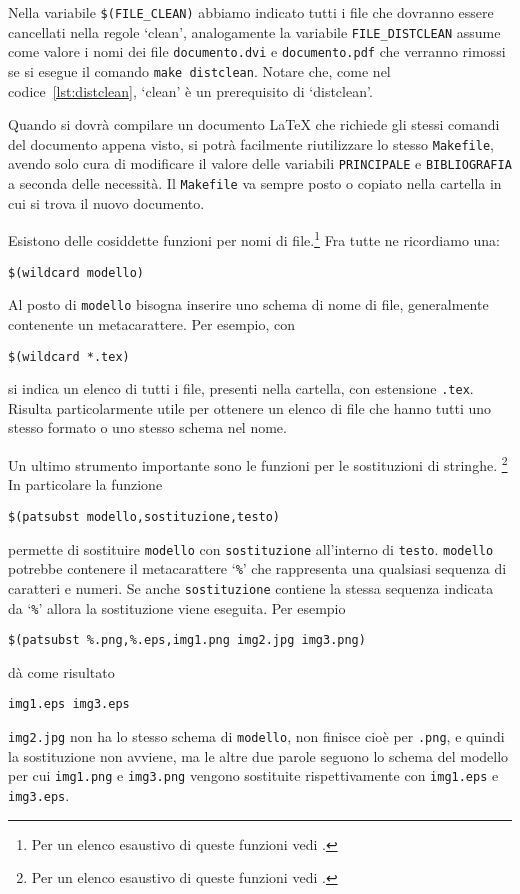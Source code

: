 Nella variabile \verb|$(FILE_CLEAN)|
abbiamo indicato tutti i file che dovranno essere cancellati nella regole
`clean', analogamente la variabile \verb|FILE_DISTCLEAN| assume come valore i
nomi dei file \verb|documento.dvi| e \verb|documento.pdf| che verranno rimossi
se si esegue il comando \verb|make distclean|.  Notare che, come nel
codice~\ref{lst:distclean}, `clean' è un prerequisito di `distclean'.

Quando si dovrà compilare un documento \LaTeX{}
che richiede gli stessi comandi del documento appena visto, si potrà facilmente
riutilizzare lo stesso \verb|Makefile|, avendo solo cura di modificare il valore
delle variabili \verb|PRINCIPALE| e \verb|BIBLIOGRAFIA| a seconda delle
necessità. Il \verb|Makefile| va sempre posto o copiato nella cartella in cui si
trova il nuovo documento.

Esistono delle cosiddette funzioni per nomi di
file.\footnote{Per un elenco esaustivo di queste funzioni vedi
  \textcite[83]{gnu:make}.} Fra tutte ne ricordiamo una:
\begin{lstlisting}
$(wildcard modello)
\end{lstlisting}
Al posto di \verb|modello| bisogna inserire uno schema di nome di file,
generalmente contenente un metacarattere. Per esempio, con
\begin{lstlisting}
$(wildcard *.tex)
\end{lstlisting}
si indica un elenco di tutti i file, presenti nella cartella, con estensione
\verb|.tex|.  Risulta particolarmente utile per ottenere un elenco di file che
hanno tutti uno stesso formato o uno stesso schema nel nome.

Un ultimo strumento importante sono le funzioni per le sostituzioni di
stringhe.%
\footnote{Per un elenco esaustivo di queste funzioni vedi
  \textcite[80]{gnu:make}.}  In particolare la funzione
\begin{lstlisting}
$(patsubst modello,sostituzione,testo)
\end{lstlisting}
permette di sostituire \verb|modello| con \verb|sostituzione| all'interno di
\verb|testo|.  \verb|modello| potrebbe contenere il metacarattere `\verb|%|' che
rappresenta una qualsiasi sequenza di caratteri e numeri.  Se anche
\verb|sostituzione| contiene la stessa sequenza indicata da `\verb|%|' allora
la sostituzione viene eseguita.  Per esempio
\begin{lstlisting}
$(patsubst %.png,%.eps,img1.png img2.jpg img3.png)
\end{lstlisting}
dà come risultato
\begin{verbatim}
img1.eps img3.eps
\end{verbatim}
\verb|img2.jpg| non ha lo stesso schema di \verb|modello|, non finisce cioè per
\verb|.png|, e quindi la sostituzione non avviene, ma le altre due parole
seguono lo schema del modello per cui \verb|img1.png| e \verb|img3.png| vengono
sostituite rispettivamente con \verb|img1.eps| e \verb|img3.eps|.


